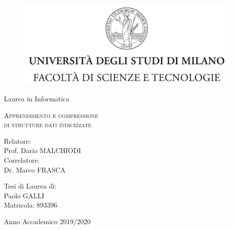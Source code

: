 \documentclass[11pt,a4paper,twoside,
openright]{book}
\begin{document}
\begin{titlepage}
	
	\begin{figure}
		\centering
		\includegraphics[width=424pt]{tesiSCIENZE_TECNOLOGIE}%
		\vspace{0.5 cm}
	\end{figure}
	

\begin{center}
{\LARGE Laurea in Informatica}
\end{center}

\begin{center}
\vspace{3 cm}
{\Large \textsc{Apprendimento e compressione \\
di strutture dati indicizzate} }
\end{center}
\par
  \vspace{3 cm}
  
  \begin{flushleft}
  		 Relatore:\\ Prof. Dario MALCHIODI\\
		 
  		 \noindent Correlatore:\\ Dr. Marco FRASCA
  \end{flushleft}
  \vspace{1 cm}
  \begin{flushright}
  	Tesi di Laurea di:\\ Paolo GALLI\\ Matricola: 893396
  \end{flushright}
    	  
\vfill
\begin{center}
	{\large Anno Accademico 2019/2020}
\end{center}
\end{titlepage}
\end{document}
